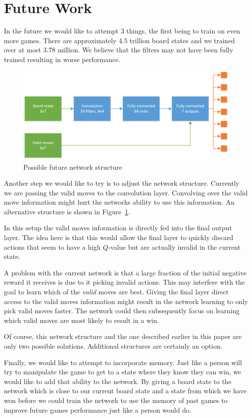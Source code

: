 \section{Future Work}
In the future we would like to attempt 3 things, the first being to train on even more games. There are approximately 4.5 trillion board states and we trained over at most 3.78 million. We believe that the filters may not have been fully trained resulting in worse performance. 

\begin{figure}[!ht]
  \includegraphics[width=\textwidth]{Network2.png}
  \caption{Possible future network structure}
  \label{fig:struct_future}
\end{figure} 

Another step we would like to try is to adjust the network structure. Currently we are passing the valid moves to the convolution layer. Convolving over the valid move information might hurt the networks ability to use this information. An alternative structure is shown in Figure~\ref{fig:struct_future}.

In this setup the valid moves information is directly fed into the final output layer. The idea here is that this would allow the final layer to quickly discard actions that seem to have a high $Q$-value but are actually invalid in the current state. 

A problem with the current network is that a large fraction of the initial negative reward it receives is due to it picking invalid actions. This may interfere with the goal to learn which of the \textit{valid} moves are best. Giving the final layer direct access to the valid moves information might result in the network learning to only pick valid moves faster. The network could then subsequently focus on learning which valid moves are most likely to result in a win.

Of course, this network structure and the one described earlier in this paper are only two possible solutions. Additional structures are certainly an option.

Finally, we would like to attempt to incorporate memory. Just like a person will try to manipulate the game to get to a state where they know they can win, we would like to add that ability to the network. By giving a board state to the network which is close to our current board state and a state from which we have won before we could train the network to use the memory of past games to improve future games performance just like a person would do.
